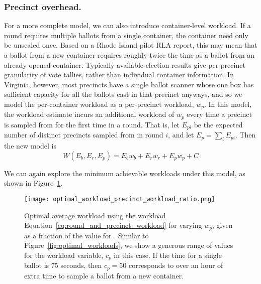 \subsubsection{Precinct overhead.} For a more complete model, we can also introduce container-level workload. If a round requires multiple ballots from a single container, the container need only be unsealed once. Based on a Rhode Island pilot RLA report\cite{RI-report}, this may mean that a ballot from a new container requires roughly twice the time as a ballot from an already-opened container. Typically available election results give per-precinct granularity of vote tallies, rather than individual container information. In Virginia, however, most precincts have a single ballot scanner whose one box has sufficient capacity for all the ballots cast in that precinct anyways, and so we model the per-container workload as a per-precinct workload, $w_p$. In this model, the workload estimate incurs an additional workload of $w_p$ every time a precinct is sampled from for the first time in a round. That is, let $E_{pi}$ be the expected number of distinct precincts sampled from in round $i$, and let $E_p=\sum_i E_{pi}$. Then the new model is
\begin{equation}
W(E_b, E_r, E_p) = E_b w_b + E_r w_r + E_p w_p + C
\label{eq:round_and_precinct_workload}
\end{equation}

We can again explore the minimum achievable workloads under this model, as shown in Figure~\ref{fig:optimal_workload_precinct_workload_ratio}.

\begin{figure}
\texttt{[image: optimal\_workload\_precinct\_workload\_ratio.png]}
\caption{Optimal average workload using the workload Equation~\ref{eq:round_and_precinct_workload} for varying $w_p$, given as a fraction of the value for \Providence. Similar to Figure~\ref{fig:optimal_workloads}, we show a generous range of values for the workload variable, $c_p$ in this case. If the time for a single ballot is $75$ seconds, then $c_p=50$ corresponds to over an hour of extra time to sample a ballot from a new container.}
\label{fig:optimal_workload_precinct_workload_ratio}
\end{figure}


